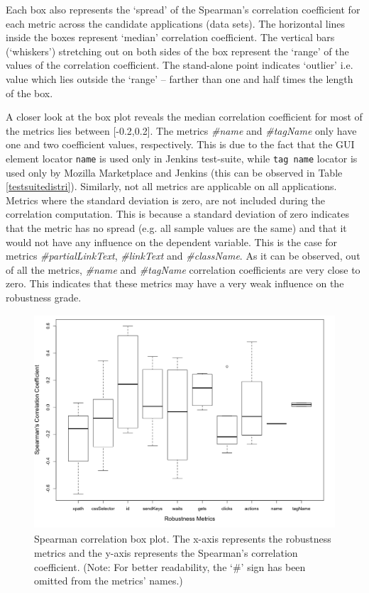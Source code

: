 Each box also represents the `spread' of the Spearman's correlation coefficient for each metric across the candidate applications (data sets). The horizontal lines inside the boxes represent `median' correlation coefficient. The vertical bars (`whiskers') stretching out on both sides of the box represent the `range' of the values of the correlation coefficient. The stand-alone point indicates `outlier' i.e. value which lies outside the `range' -- farther than one and half times the length of the box. 

A closer look at the box plot reveals the median correlation coefficient for most of the metrics lies between [-0.2,0.2]. The metrics \textit{\#name} and \textit{\#tagName} only have one and two coefficient values, respectively. This is due to the fact that the GUI element locator \texttt{name} is used only in Jenkins test-suite, while \texttt{tag name} locator is used only by Mozilla Marketplace and Jenkins (this can be observed in Table \ref{testsuitedistri}). Similarly, not all metrics are applicable on all applications. Metrics where the standard deviation is zero, are not included during the correlation computation. This is because a standard deviation of zero indicates that the metric has no spread (e.g. all sample values are the same) and that it would not have any influence on the dependent variable. This is the case for metrics \textit{\#partialLinkText}, \textit{\#linkText} and \textit{\#className}. As it can be observed, out of all the metrics, \textit{\#name} and \textit{\#tagName} correlation coefficients are very close to zero. This indicates that these metrics may have a very weak influence on the robustness grade. 

\begin{figure}[ht!] 
\centering     %
\includegraphics[width=12cm,height=8cm]{./Figures/spearman-rq2}
 \captionsetup{justification=justified,
singlelinecheck=false}
\caption{Spearman correlation box plot. The x-axis represents the robustness metrics and the y-axis represents the Spearman's correlation coefficient. (Note: For better readability, the `\#' sign has been omitted from the metrics' names.)}
\label{fig:spearman}
\end{figure} 

